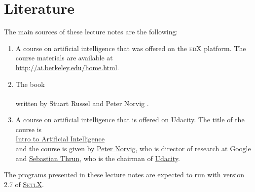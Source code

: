 \section{Literature}
The main sources of these lecture notes are the following:
\begin{enumerate}
\item A course on artificial intelligence that was offered on the \textsc{edX} platform.  The course
      materials are available at  
      \\[0.2cm]
      \hspace*{1.3cm}
      \href{http://ai.berkeley.edu/home.html}{http://ai.berkeley.edu/home.html}.
\item The book
      \\[0.2cm]
      \hspace*{1.3cm}
      \\[0.2cm]
      written by Stuart Russel and Peter Norvig \cite{russell:2009}.
\item A course on artificial intelligence that is offered on \href{https://www.udacity.com}{Udacity}.  The title of the
      course is
      \\[0.2cm]
      \hspace*{1.3cm}
      \href{https://www.udacity.com/course/intro-to-artificial-intelligence--cs271}{Intro to Artificial Intelligence}
      \\[0.2cm]
      and the course is given by \href{https://en.wikipedia.org/wiki/Peter_Norvig}{Peter Norvig}, who is
      director of research at Google and \href{https://en.wikipedia.org/wiki/Sebastian_Thrun}{Sebastian Thrun},
      who is the chairman of \href{https://www.udacity.com}{Udacity}.
\end{enumerate}
The programs presented in these lecture notes are expected to run with version 2.7 of 
\href{https://randoom.org/Software/SetlX}{\textsc{SetlX}}.


